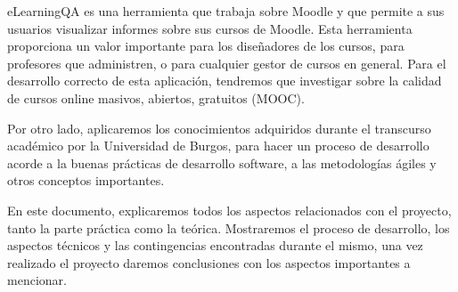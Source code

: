 
eLearningQA es una herramienta que trabaja sobre Moodle y que permite a sus usuarios visualizar informes
sobre sus cursos de Moodle. Esta herramienta proporciona un valor importante para los diseñadores de
los cursos, para profesores que administren, o para cualquier gestor de cursos en general. Para el 
desarrollo correcto de esta aplicación, tendremos que investigar sobre la calidad de cursos online masivos, abiertos, gratuitos (MOOC). 

Por otro lado, aplicaremos los conocimientos adquiridos durante el transcurso académico por la Universidad de Burgos, para hacer un proceso de desarrollo acorde a la buenas prácticas de desarrollo software, a las metodologías ágiles y otros conceptos importantes.

En este documento, explicaremos todos los aspectos relacionados con el proyecto, tanto la parte práctica como la teórica. Mostraremos el proceso de desarrollo, los aspectos técnicos y las contingencias encontradas durante el mismo, una vez realizado el proyecto daremos conclusiones con los aspectos importantes a mencionar. 

